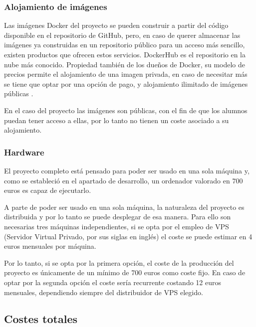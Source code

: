 \subsubsection{Alojamiento de imágenes}

Las imágenes Docker del proyecto se pueden construir a partir del código disponible en el repositorio de GitHub, pero, en caso de querer almacenar las imágenes ya construidas en un repositorio público para un acceso más sencillo, existen productos que ofrecen estos servicios. DockerHub \cite{dockerhub} es el repositorio en la nube más conocido. Propiedad también de los dueños de Docker, su modelo de precios permite el alojamiento de una imagen privada, en caso de necesitar más se tiene que optar por una opción de pago, y alojamiento ilimitado de imágenes públicas \cite{dockerhub_pricing}.

En el caso del proyecto las imágenes son públicas, con el fin de que los alumnos puedan tener acceso a ellas, por lo tanto no tienen un coste asociado a su alojamiento.

\subsubsection{Hardware}

El proyecto completo está pensado para poder ser usado en una sola máquina y, como se estableció en el apartado de desarrollo, un ordenador valorado en 700 euros es capaz de ejecutarlo.

A parte de poder ser usado en una sola máquina, la naturaleza del proyecto es distribuida y por lo tanto se puede desplegar de esa manera. Para ello son necesarias tres máquinas independientes, si se opta por el empleo de VPS (Servidor Virtual Privado, por sus siglas en inglés) el coste se puede estimar en 4 euros mensuales por máquina.

Por lo tanto, si se opta por la primera opción, el coste de la producción del proyecto es únicamente de un mínimo de 700 euros como coste fijo. En caso de optar por la segunda opción el coste sería recurrente costando 12 euros mensuales, dependiendo siempre del distribuidor de VPS elegido.

\subsection{Costes totales}

